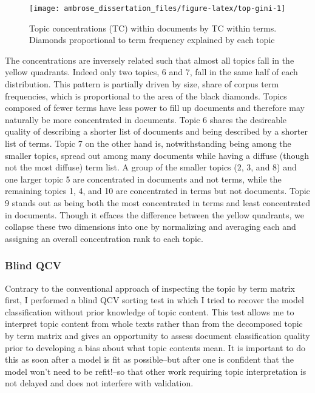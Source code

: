 \documentclass[]{book}
\theoremstyle{definition}
\theoremstyle{definition}
\theoremstyle{definition}
\theoremstyle{remark}
\begin{document}
\begin{figure}

{\centering \texttt{[image: ambrose\_dissertation\_files/figure-latex/top-gini-1]} 

}

\caption{Topic concentrations (TC) within documents by TC within terms. Diamonds proportional to term frequency explained by each topic}\label{fig:top-gini}
\end{figure}

The concentrations are inversely related such that almost all topics
fall in the yellow quadrants. Indeed only two topics, 6 and 7, fall in
the same half of each distribution. This pattern is partially driven by
size, share of corpus term frequencies, which is proportional to the
area of the black diamonds. Topics composed of fewer terms have less
power to fill up documents and therefore may naturally be more
concentrated in documents. Topic 6 shares the desireable quality of
describing a shorter list of documents and being described by a shorter
list of terms. Topic 7 on the other hand is, notwithstanding being among
the smaller topics, spread out among many documents while having a
diffuse (though not the most diffuse) term list. A group of the smaller
topics (2, 3, and 8) and one larger topic 5 are concentrated in
documents and not terms, while the remaining topics 1, 4, and 10 are
concentrated in terms but not documents. Topic 9 stands out as being
both the most concentrated in terms and least concentrated in documents.
Though it effaces the difference between the yellow quadrants, we
collapse these two dimensions into one by normalizing and averaging each
and assigning an overall concentration rank to each topic.

\hypertarget{blind-qcv}{%
\subsubsection{Blind QCV}\label{blind-qcv}}

Contrary to the conventional approach of inspecting the topic by term
matrix first, I performed a blind QCV sorting test in which I tried to
recover the model classification without prior knowledge of topic
content. This test allows me to interpret topic content from whole texts
rather than from the decomposed topic by term matrix and gives an
opportunity to assess document classification quality prior to
developing a bias about what topic contents mean. It is important to do
this as soon after a model is fit as possible--but after one is
confident that the model won't need to be refit!--so that other work
requiring topic interpretation is not delayed and does not interfere
with validation.
\end{document}
